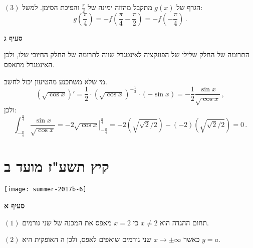 $(3)$
הגרף של 
$g(x)$
מתקבל מהזזה ימינה של
$\frac{\pi}{2}$
והפיכת הסימן. למשל:
\[
g\left(\frac{\pi}{4}\right)=-f\left(\frac{\pi}{4}-\frac{\pi}{2}\right)=-f\left(-\frac{\pi}{4}\right)\,.
\]
\begin{center}
\end{center}

\textbf{סעיף ג}

התרומה של החלק שלילי של הפונקציה לאינטגרל שווה לתרומה של החלק החיובי שלו, ולכן האינטגרל מתאפס.

מי שלא משתכנע מהטיעון יכול לחשב.
\[
(\sqrt{\cos x})' = \frac{1}{2}\cdot(\sqrt{\cos x})^{-\frac{1}{2}}\cdot (-\sin x)=-\frac{1}{2}\frac{\sin x}{\sqrt{\cos x}}\,,
\]
ולכן:
\[
\int_{-\frac{\pi}{4}}^{\frac{\pi}{4}} \frac{\sin x}{\sqrt{\cos x}}=\left.-2\sqrt{\cos x}\right|_{-\frac{\pi}{4}}^{\frac{\pi}{4}}=-2\left(\sqrt{\sqrt{2}/{2}}\right)-(-2)\left(\sqrt{\sqrt{2}/{2}}\right)=0\,.
\]

\np


\section{קיץ תשע"ז מועד ב}


\begin{center}
\texttt{[image: summer-2017b-6]}
\end{center}

\textbf{סעיף א}

$(1)$
תחום ההגדה הוא
$x\neq 2$
כי
$x=2$
מאפס את המכנה של שני גורמים.

$(2)$
כאשר 
$x\rightarrow \pm\infty$
שני גורמים שואפים לאפס, ולכן ה%
\asm{}
האופקית היא
$y=a$.

